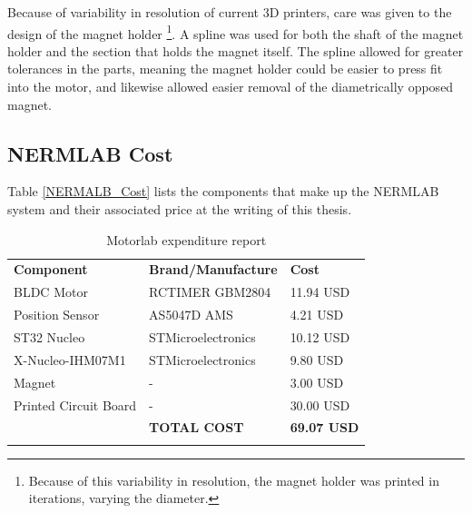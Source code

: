 Because of variability in resolution of current 3D printers, care was given to the design of the magnet holder \footnote{Because of this variability in resolution, the magnet holder was printed in iterations, varying the diameter.}. A spline was used for both the shaft of the magnet holder and the section that holds the magnet itself. The spline allowed for greater tolerances in the parts, meaning the magnet holder could be easier to press fit into the motor, and likewise allowed easier removal of the diametrically opposed magnet.

\subsection{NERMLAB Cost}
\label{makereference2.1.4} 

Table \ref{NERMALB_Cost} lists the components that make up the NERMLAB system and their associated price at the writing of this thesis.

\begin{table}[ht]
\begin{center}
\caption{Motorlab expenditure report}
\begin{tabular}[c]{ l l l }
\label{NERMALB_Cost}
\textbf{Component} & \textbf{Brand/Manufacture} & \textbf{Cost} \\

\Xhline{2\arrayrulewidth}
\rowcolor{gray!20}
BLDC Motor & RCTIMER GBM2804 & 11.94 USD\\


Position Sensor & AS5047D AMS & 4.21 USD\\

\rowcolor{gray!20}
ST32 Nucleo & STMicroelectronics & 10.12 USD\\


X-Nucleo-IHM07M1 & STMicroelectronics & 9.80 USD\\

\rowcolor{gray!20}
Magnet & - & 3.00 USD\\


Printed Circuit Board & - & 30.00 USD\\

\hline
\rowcolor{gray!20}
& \textbf{TOTAL COST} & \textbf{69.07 USD}\\

\Xhline{2\arrayrulewidth}
\end{tabular}

\label{table1}
\end{center}
\end{table}

